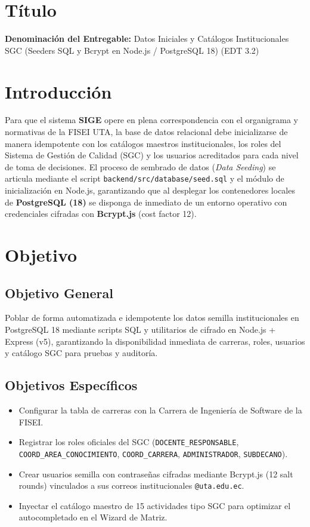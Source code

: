 \documentclass[12pt,a4paper]{article}
\begin{document}
\section{Título}
\textbf{Denominación del Entregable:} Datos Iniciales y Catálogos Institucionales SGC (Seeders SQL y Bcrypt en Node.js / PostgreSQL 18) (EDT 3.2)



\section{Introducción}
Para que el sistema \textbf{SIGE} opere en plena correspondencia con el organigrama y normativas de la FISEI UTA, la base de datos relacional debe inicializarse de manera idempotente con los catálogos maestros institucionales, los roles del Sistema de Gestión de Calidad (SGC) y los usuarios acreditados para cada nivel de toma de decisiones. El proceso de sembrado de datos (\textit{Data Seeding}) se articula mediante el script \texttt{backend/src/database/seed.sql} y el módulo de inicialización en Node.js, garantizando que al desplegar los contenedores locales de \textbf{PostgreSQL (18)} se disponga de inmediato de un entorno operativo con credenciales cifradas con \textbf{Bcrypt.js} (cost factor 12).

\section{Objetivo}

\subsection{Objetivo General}
Poblar de forma automatizada e idempotente los datos semilla institucionales en PostgreSQL 18 mediante scripts SQL y utilitarios de cifrado en Node.js + Express (v5), garantizando la disponibilidad inmediata de carreras, roles, usuarios y catálogo SGC para pruebas y auditoría.

\subsection{Objetivos Específicos}
\begin{itemize}[leftmargin=1.5em, itemsep=1.5pt, topsep=1.5pt]
    \item Configurar la tabla de carreras con la Carrera de Ingeniería de Software de la FISEI.
    \item Registrar los roles oficiales del SGC (\texttt{DOCENTE\_RESPONSABLE}, \texttt{COORD\_AREA\_CONOCIMIENTO}, \texttt{COORD\_CARRERA}, \texttt{ADMINISTRADOR}, \texttt{SUBDECANO}).
    \item Crear usuarios semilla con contraseñas cifradas mediante Bcrypt.js (12 salt rounds) vinculados a sus correos institucionales \texttt{@uta.edu.ec}.
    \item Inyectar el catálogo maestro de 15 actividades tipo SGC para optimizar el autocompletado en el Wizard de Matriz.
\end{itemize}
\end{document}
